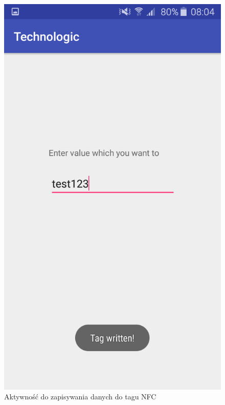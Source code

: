 \documentclass{article}
\numberwithin{equation}{section}
\begin{document}
\begin{figure}[H]
    \centering
    \includegraphics[scale=0.22]{write.png}
    \caption{Aktywność do zapisywania danych do tagu NFC}
\end{figure}
\end{document}
